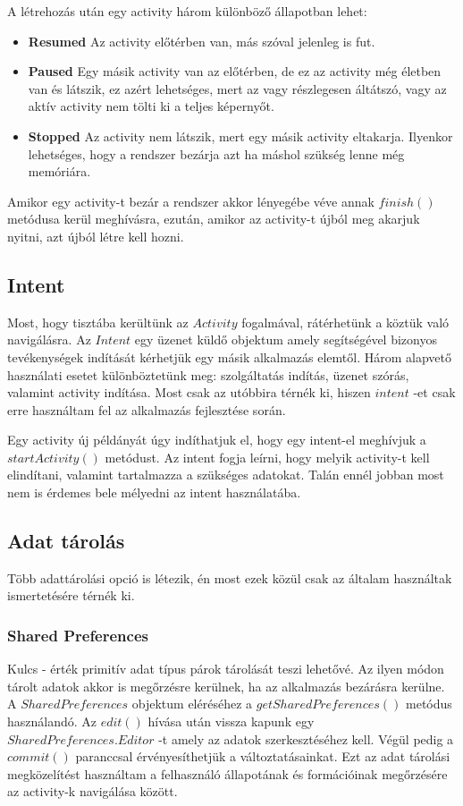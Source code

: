 \documentclass[12pt]{report}
\theoremstyle{definition}
\begin{document}
	A létrehozás után egy activity három különböző állapotban lehet:
	\begin{itemize}
		\item \textbf{Resumed} Az activity előtérben van, más szóval jelenleg is fut.
		\item \textbf{Paused} Egy másik activity van az előtérben, de ez az activity még életben van és látszik, ez azért lehetséges, mert az vagy részlegesen áltátszó, vagy az aktív activity nem tölti ki a teljes képernyőt.
		\item \textbf{Stopped} Az activity nem látszik, mert egy másik activity eltakarja. Ilyenkor lehetséges, hogy a rendszer bezárja azt ha máshol szükség lenne még memóriára.
	\end{itemize}
	
	Amikor egy activity-t bezár a rendszer akkor lényegébe véve annak  $finish\left(\right)$ metódusa kerül meghívásra, ezután, amikor az activity-t újból meg akarjuk nyitni, azt újból létre kell hozni.
	
	\subsection*{Intent}
	Most, hogy tisztába kerültünk az $Activity$ fogalmával, rátérhetünk a köztük való navigálásra. Az $Intent$ egy üzenet küldő objektum amely segítségével bizonyos tevékenységek indítását kérhetjük egy másik alkalmazás elemtől. Három alapvető használati esetet különböztetünk meg: szolgáltatás indítás, üzenet szórás, valamint activity indítása. Most csak az utóbbira térnék ki, hiszen $intent$ -et csak erre használtam fel az alkalmazás fejlesztése során.
	
	Egy activity új példányát úgy indíthatjuk el, hogy egy intent-el meghívjuk a \linebreak$startActivity\left(\right)$ metódust. Az intent fogja leírni, hogy melyik activity-t kell elindítani, valamint tartalmazza a szükséges adatokat. Talán ennél jobban most nem is érdemes bele mélyedni az intent használatába.
	
	\subsection*{Adat tárolás}
	Több adattárolási opció is létezik, én most ezek közül csak az általam használtak ismertetésére térnék ki.
	
	\subsubsection{Shared Preferences}
	Kulcs - érték primitív adat típus párok tárolását teszi lehetővé. Az ilyen módon tárolt adatok akkor is megőrzésre kerülnek, ha az alkalmazás bezárásra kerülne. A \linebreak$SharedPreferences$ objektum eléréséhez a $getSharedPreferences\left(\right)$ metódus használandó. Az $edit\left(\right)$ hívása után vissza kapunk egy $SharedPreferences.Editor$ -t amely az adatok szerkesztéséhez kell. Végül pedig a $commit\left(\right)$ paranccsal érvényesíthetjük a változtatásainkat. Ezt az adat tárolási megközelítést használtam a felhasználó állapotának és formációinak megőrzésére az activity-k navigálása között.
	
\end{document}
